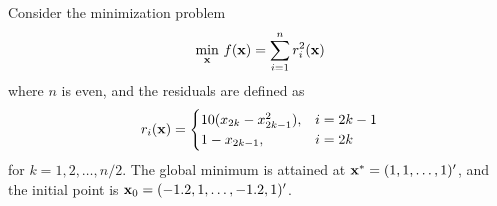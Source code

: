 \begin{example}
	Consider the minimization problem
	\begin{equation}
		\min_{\mathbf{x}}\,f(\mathbf{x})=\sum_{i=1}^{n} r_{i}^{2}(\mathbf{x})
	\end{equation}
	where \(n\) is even, and the residuals are defined as
	\begin{equation}
		r_{i}(\mathbf{x})=
		\begin{cases}
			10(x_{2k}-x_{2k-1}^{2}), & i=2k-1 \\
			1-x_{2k-1},              & i=2k   \\
		\end{cases}
	\end{equation}
	for \(k=1,2,\ldots,n/2\). The global minimum is attained at \(\mathbf{x}^{*}=(1,1,\ldots,1)^{\prime}\), and the initial point is \(\mathbf{x}_{0}=(-1.2,1,\ldots,-1.2,1)^{\prime}\).
\end{example}

